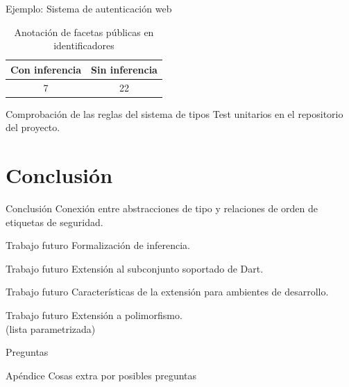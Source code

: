 \documentclass[aspectratio=169,10pt]{beamer}
\begin{document}
\begin{frame}[fragile]{Ejemplo: Sistema de autenticación web}
	\begin{table}
		\caption{Anotación de facetas públicas en identificadores}
		\begin{tabular}{c|c}
      Con inferencia & Sin inferencia\\
      \hline
      7 & 22\\
		\end{tabular}
	\end{table}
\end{frame}

\begin{frame}[fragile]{Comprobación de las reglas del sistema de tipos}
	Test unitarios en el repositorio del proyecto.
\end{frame}

\section{Conclusión}

\begin{frame}[fragile]{Conclusión}
	Conexión entre abstracciones de tipo y relaciones de orden de etiquetas de seguridad.
\end{frame}

\begin{frame}[fragile]{Trabajo futuro}
	Formalización de inferencia.
\end{frame}

\begin{frame}[fragile]{Trabajo futuro}
	Extensión al subconjunto soportado de Dart.
\end{frame}

\begin{frame}[fragile]{Trabajo futuro}
	Características de la extensión para ambientes de desarrollo.
\end{frame}

\begin{frame}[fragile]{Trabajo futuro}
	Extensión a polimorfismo. \\ \pause
	(lista parametrizada)
\end{frame}


{
\begin{frame}[standout]
  Preguntas
\end{frame}
}

\appendix

\begin{frame}[fragile]{Apéndice}
  Cosas extra por posibles preguntas
\end{frame}
\end{document}
